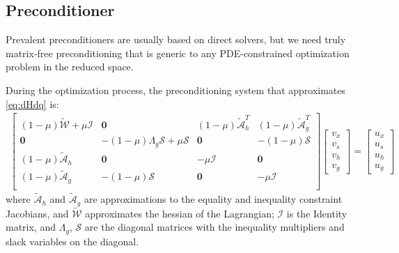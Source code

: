 \documentclass{article}
\theoremstyle{definition}
\begin{document}
\subsection{Preconditioner}
Prevalent preconditioners are usually based on direct solvers, but we need truly matrix-free preconditioning that is generic to any PDE-constrained optimization problem in the reduced space. 

During the optimization process, the preconditioning system that approximates \eqref{eq:dHdq} is:
\begin{equation}\label{eq:pcwithmu}
\begin{aligned}
\begin{bmatrix}
(1-\mu) \tilde{\mathcal{W}}  + \mu \mathcal{I} & \boldsymbol{0} & (1-\mu)\tilde{\mathcal{A}}_{h}^T  & (1-\mu)\tilde{\mathcal{A}}_{g}^T   \\
\boldsymbol{0}     &  -(1-\mu) \Lambda_g \mathcal{S} + \mu  \mathcal{S}   &  \boldsymbol{0} & -(1-\mu)\mathcal{S}  \\
(1-\mu)\tilde{\mathcal{A}}_{h}  &  \boldsymbol{0}  &  -\mu \mathcal{I} & \boldsymbol{0}  \\
(1-\mu)\tilde{\mathcal{A}}_{g}  & -(1-\mu) \mathcal{S}   &  \boldsymbol{0}    &   -\mu \mathcal{I} \\
\end{bmatrix}
\begin{bmatrix} v_x \\ v_s \\ v_h \\ v_g \end{bmatrix}=\begin{bmatrix} u_x \\ u_s \\ u_h \\ u_g \end{bmatrix}
\end{aligned}
\end{equation}
where $\tilde{\mathcal{A}}_{h}$ and $\tilde{\mathcal{A}}_{g}$ are approximations to the equality and inequality constraint Jacobians, and $\tilde{\mathcal{W}}$ approximates the hessian of the Lagrangian; $\mathcal{I}$ is the Identity matrix, and $\Lambda_g$, $\mathcal{S}$ are the diagonal matrices with the inequality multipliers and slack variables on the diagonal. 
\end{document}
